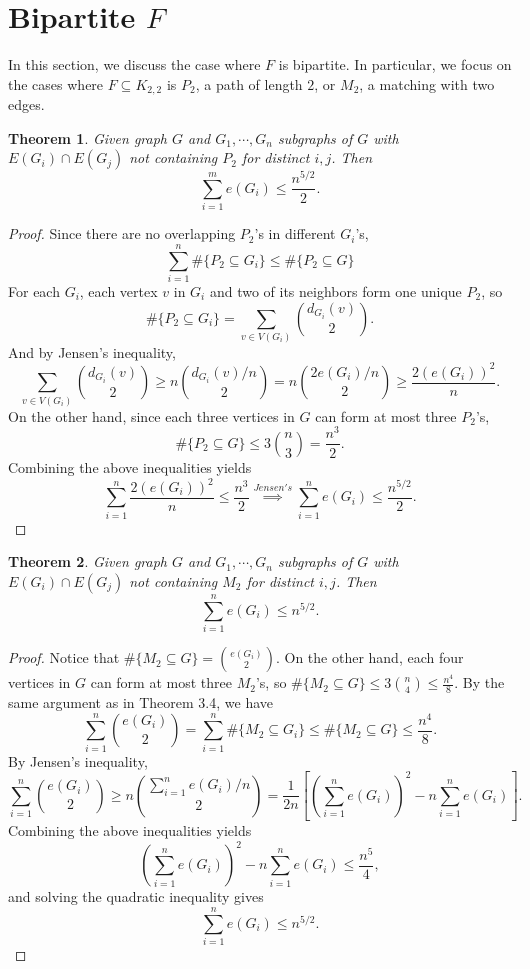 \documentclass[12pt]{report}
\newtheorem{theorem}{Theorem}[chapter]
\begin{document}
\section{Bipartite $F$}

In this section, we discuss the case where $F$ is bipartite. In particular, we focus on the cases
where $F \subseteq K_{2, 2}$ is $P_2$, a path of length $2$, or $M_2$, a matching with two edges.

\begin{theorem}
  Given graph $G$ and $G_1, \cdots, G_n$ subgraphs of $G$ with $E(G_i) \cap E(G_j)$ not containing
  $P_2$ for distinct $i, j$. Then
  \[
    \sum_{i = 1}^m e(G_i) \leq \frac{n^{5/2}}{2}.
  \]
\end{theorem}

\begin{proof}
  Since there are no overlapping $P_2$'s in different $G_i$'s, 
  \[
    \sum_{i = 1}^n \#\{P_2 \subseteq G_i\} \leq \#\{P_2 \subseteq G\}
  \]
  For each $G_i$, each vertex $v$ in $G_i$ and two of its neighbors form one unique $P_2$, so
  \[
    \#\{P_2 \subseteq G_i\} = \sum_{v \in V(G_i)} \binom{d_{G_i}(v)}{2}.
  \]
  And by Jensen's inequality,
  \[
    \sum_{v \in V(G_i)} \binom{d_{G_i}(v)}{2} \geq n\binom{d_{G_i}(v)/n}{2} = n\binom{2e(G_i)/n}{2} \geq \frac{2(e(G_i))^2}{n}.
  \]
  On the other hand, since each three vertices in $G$ can form at most three $P_2$'s, 
  \[
    \#\{P_2 \subseteq G\} \leq 3\binom{n}{3} = \frac{n^3}{2}.
  \]
  Combining the above inequalities yields
  \[
    \sum_{i = 1}^n \frac{2(e(G_i))^2}{n} \leq \frac{n^3}{2} \overset{Jensen's}{\implies} \sum_{i = 1}^n e(G_i) \leq \frac{n^{5/2}}{2}.
  \]
\end{proof}



\begin{theorem}
  Given graph $G$ and $G_1, \cdots, G_n$ subgraphs of $G$ with $E(G_i) \cap E(G_j)$ not containing
  $M_2$ for distinct $i, j$. Then
  \[
    \sum_{i = 1}^n e(G_i) \leq n^{5/2}.
  \]
\end{theorem}

\begin{proof}
  Notice that $\#\{M_2 \subseteq G\} = \binom{e(G_i)}{2}$. On the other hand, each four vertices in
  $G$ can form at most three $M_2$'s, so $\#\{M_2 \subseteq G\} \leq 3\binom{n}{4} \leq
  \frac{n^4}{8}$. By the same argument as in Theorem 3.4, we have 
  \[
    \sum_{i = 1}^n \binom{e(G_i)}{2} = \sum_{i = 1}^n \#\{M_2 \subseteq G_i\} \leq \#\{M_2 \subseteq G\} \leq \frac{n^4}{8}.
  \]
  By Jensen's inequality,
  \[
    \sum_{i = 1}^n \binom{e(G_i)}{2} \geq n\binom{\sum_{i = 1}^n e(G_i)/n}{2} = \frac{1}{2n}\left[\left(\sum_{i = 1}^n e(G_i)\right)^2 - n\sum_{i = 1}^n e(G_i)\right].
  \]
  Combining the above inequalities yields
  \[
    \left(\sum_{i = 1}^n e(G_i)\right)^2 - n\sum_{i = 1}^n e(G_i) \leq \frac{n^5}{4},
  \]
  and solving the quadratic inequality gives
  \[
    \sum_{i = 1}^n e(G_i) \leq n^{5/2}.
  \]
\end{proof}
\end{document}
